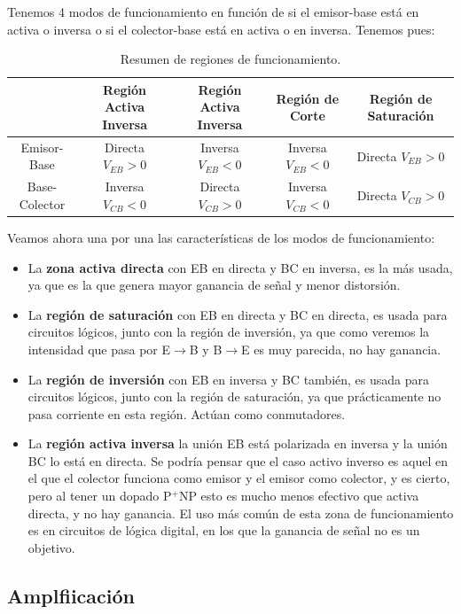 Tenemos 4 modos de funcionamiento en función de si el emisor-base está en activa o inversa o si el colector-base está en activa o en inversa. Tenemos pues:

\begin{table}[H] \centering \small
    \begin{tabular}{c|cccc}
        \toprule & Región Activa Inversa & Región Activa Inversa & Región de Corte & Región de Saturación \\ \midrule
        Emisor-Base & Directa $V_{EB}>0$ & Inversa  $V_{EB}<0$ & Inversa  $V_{EB}<0$ & Directa   $V_{EB}>0$\\
        Base-Colector & Inversa $V_{CB}<0$ & Directa  $V_{CB}>0$ & Inversa  $V_{CB}<0$ & Directa  $V_{CB}>0$ \\ \bottomrule        
    \end{tabular}
    \label{Tab:04-01}
    \caption{Resumen de regiones de funcionamiento.}
\end{table}
Veamos ahora una por una las características de los modos de funcionamiento:

\begin{itemize}
    \item La \textbf{zona activa directa} con EB en directa y BC en inversa, es la más usada, ya que es la que genera mayor ganancia de señal y menor distorsión.
    \item La \textbf{región de saturación} con EB en directa y BC en directa, es usada para circuitos lógicos, junto con la región de inversión, ya que como veremos la intensidad que pasa por E$\to$B y B$\to$E es muy parecida, no hay ganancia. 
    \item La \textbf{región de inversión} con EB en inversa y BC también, es usada para circuitos lógicos, junto con la región de saturación, ya que prácticamente no pasa corriente en esta región. Actúan como conmutadores.
    \item La \textbf{región activa inversa} la unión EB está polarizada en inversa y la unión BC lo está en directa. Se podría pensar que el caso activo inverso es aquel en el que el colector funciona como emisor y el emisor como colector, y es cierto, pero al tener un dopado P$^+$NP esto es mucho menos efectivo que activa directa, y no hay ganancia. El uso más común de esta zona de funcionamiento es en circuitos de lógica digital, en los que la ganancia de señal no es un objetivo.  
\end{itemize}

\subsection{Amplfiicación}

